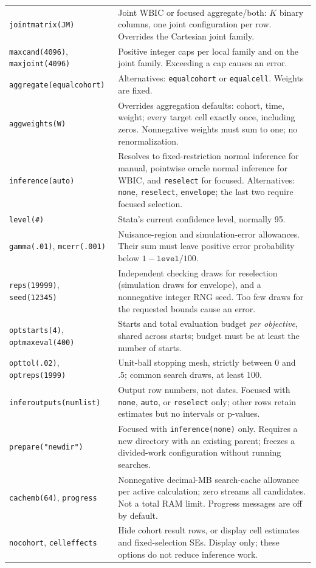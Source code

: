 \documentclass[11pt]{article}
\newcommand{\cmd}[1]{\texttt{#1}}
\begin{document}
{\begin{longtable}{@{}p{.34\linewidth}p{.62\linewidth}@{}}
\cmd{jointmatrix(JM)} & Joint WBIC or focused aggregate/both: $K$ binary columns, one joint configuration per row. Overrides the Cartesian joint family. \\
\cmd{maxcand(4096)}, \cmd{maxjoint(4096)} & Positive integer caps per local family and on the joint family. Exceeding a cap causes an error. \\
\cmd{aggregate(equalcohort)} & Alternatives: \cmd{equalcohort} or \cmd{equalcell}. Weights are fixed. \\
\cmd{aggweights(W)} & Overrides aggregation defaults: cohort, time, weight; every target cell exactly once, including zeros. Nonnegative weights must sum to one; no renormalization. \\
\cmd{inference(auto)} & Resolves to fixed-restriction normal inference for manual, pointwise oracle normal inference for WBIC, and \cmd{reselect} for focused. Alternatives: \cmd{none}, \cmd{reselect}, \cmd{envelope}; the last two require focused selection. \\
\cmd{level(\#)} & Stata's current confidence level, normally 95. \\
\cmd{gamma(.01)}, \cmd{mcerr(.001)} & Nuisance-region and simulation-error allowances. Their sum must leave positive error probability below $1-\texttt{level}/100$. \\
\cmd{reps(19999)}, \cmd{seed(12345)} & Independent checking draws for reselection (simulation draws for envelope), and a nonnegative integer RNG seed. Too few draws for the requested bounds cause an error. \\
\cmd{optstarts(4)}, \cmd{optmaxeval(400)} & Starts and total evaluation budget \emph{per objective}, shared across starts; budget must be at least the number of starts. \\
\cmd{opttol(.02)}, \cmd{optreps(1999)} & Unit-ball stopping mesh, strictly between 0 and .5; common search draws, at least 100. \\
\cmd{inferoutputs(numlist)} & Output row numbers, not dates. Focused with \cmd{none}, \cmd{auto}, or \cmd{reselect} only; other rows retain estimates but no intervals or p-values. \\
\cmd{prepare("newdir")} & Focused with \cmd{inference(none)} only. Requires a new directory with an existing parent; freezes a divided-work configuration without running searches. \\
\cmd{cachemb(64)}, \cmd{progress} & Nonnegative decimal-MB search-cache allowance per active calculation; zero streams all candidates. Not a total RAM limit. Progress messages are off by default. \\
\cmd{nocohort}, \cmd{celleffects} & Hide cohort result rows, or display cell estimates and fixed-selection SEs. Display only; these options do not reduce inference work. \\
\end{longtable}}
\end{document}
